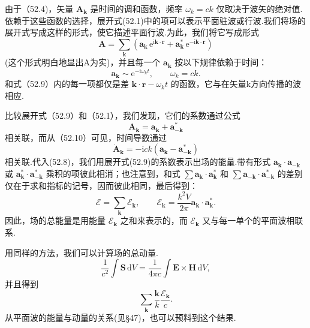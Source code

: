 由于（52.4)，矢量 $\boldsymbol{A}_{\boldsymbol{k}}$ 是时间的调和函数，频率 $\omega_k = ck$ 仅取决于波矢的绝对值.依赖于这些函数的选择，展开式(52.1)中的项可以表示平面驻波或行波.我们将场的展开式写成这样的形式，使它描述平面行波.为此，我们将它写成形式
\begin{equation}
  \boldsymbol{A}=\sum_{\boldsymbol{k}}
  (\boldsymbol{a}_{\boldsymbol{k}}\,\mathrm{e}^{\mathrm{i}\boldsymbol{k}\cdot\boldsymbol{r}}
  +\boldsymbol{a}_{\boldsymbol{k}}^*\,\mathrm{e}^{-\mathrm{i}\boldsymbol{k}\cdot\boldsymbol{r}})
\end{equation}
(这个形式明白地显出A为实)，并且每一个 $\boldsymbol{a}_{\boldsymbol{k}}$ 按以下规律依赖于时间：
\begin{equation}
  \boldsymbol{a}_{\boldsymbol{k}}\sim\mathrm{e}^{-\mathrm{i}\omega_k t},
  \qquad\omega_k=ck.
\end{equation}
和式（52.9）内的每一项都仅是差 $\boldsymbol{k}\cdot\boldsymbol{r}-\omega_k t$ 的函数，它与在矢量k方向传播的波相应.

比较展开式（52.9）和（52.1），我们发现，它们的系数通过公式
\begin{equation*}
  \boldsymbol{A}_{\boldsymbol{k}}=\boldsymbol{a}_{\boldsymbol{k}}+\boldsymbol{a}_{-\boldsymbol{k}}^*
\end{equation*}
相关联，而从（52.10）可见，时间导数通过
\begin{equation*}
  \dot{\boldsymbol{A}}_{\boldsymbol{k}}
  =-\mathrm{i}ck(\boldsymbol{a}_{\boldsymbol{k}}-\boldsymbol{a}_{-\boldsymbol{k}}^*)
\end{equation*}
相关联.代入(52.8)，我们用展开式(52.9)的系数表示出场的能量.带有形式 $\boldsymbol{a}_{\boldsymbol{k}}\cdot\boldsymbol{a}_{-\boldsymbol{k}}$ 或 $\boldsymbol{a}_{\boldsymbol{k}}^*\cdot\boldsymbol{a}_{-\boldsymbol{k}}^*$ 乘积的项彼此相消；也注意到，和式 $\sum\boldsymbol{a}_{\boldsymbol{k}}\cdot\boldsymbol{a}_{\boldsymbol{k}}^*$ 和 $\sum\boldsymbol{a}_{-\boldsymbol{k}}\cdot\boldsymbol{a}_{-\boldsymbol{k}}^*$ 的差别仅在于求和指标的记号，因而彼此相同，最后得到：
\begin{equation}
  \mathcal{E}=\sum_{\boldsymbol{k}}\mathcal{E}_{\boldsymbol{k}},\qquad
  \mathcal{E}_{\boldsymbol{k}}=\frac{k^2V}{2\pi}
  \boldsymbol{a}_{\boldsymbol{k}}\cdot\boldsymbol{a}_{\boldsymbol{k}}^*.
\end{equation}
因此，场的总能量是用能量 $\mathcal{E}_{\boldsymbol{k}}$ 之和来表示的，而 $\mathcal{E}_{\boldsymbol{k}}$ 又与每一单个的平面波相联系.

用同样的方法，我们可以计算场的总动量.
\begin{equation*}
  \frac{1}{c^2}\int\boldsymbol{S}\,\mathrm{d}V
  =\frac{1}{4\pi c}\int\boldsymbol{E}\times\boldsymbol{H}\,\mathrm{d}V,
\end{equation*}
并且得到
\begin{equation}
  \sum_{\boldsymbol{k}}\frac{\boldsymbol{k}}{k}\frac{\mathcal{E}_{\boldsymbol{k}}}{c}.
\end{equation}
从平面波的能量与动量的关系(见§47)，也可以预料到这个结果.

